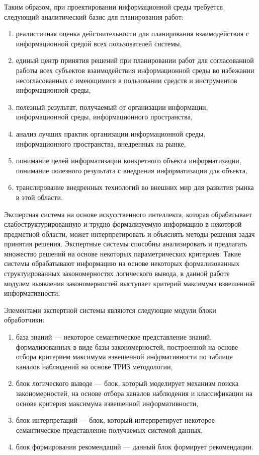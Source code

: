 Таким образом, при проектировании информационной среды требуется следующий аналитический базис для планирования работ: 
\begin{enumerate}
	\item реалистичная оценка действительности для планирования взаимодействия с информационной средой всех пользователей системы,
	\item единый центр принятия решений при планировании работ для согласованной работы всех субъектов взаимодействия информационной среды во избежании несогласованных с имеющимися в пользовании средств и инструментов информационной среды,
	\item полезный результат, получаемый от организации информации, информационной среды, информационного пространства,
	\item анализ лучших практик организации информационной среды, информационного пространства, внедренных на рынке,
	\item понимание целей информатизации конкретного объекта информатизации, понимание полезного результата с внедрения информатизации для объекта,
	\item транслирование внедренных технологий во внешних мир для развития рынка в этой области.
\end{enumerate}

Экспертная система на основе искусственного интеллекта, которая обрабатывает слабоструктурированную и трудно формализуемую информацию в некоторой предметной области, может интерпретировать и объяснять методы решения задач принятия решения. Экспертные системы способны анализировать и предлагать множество решений на основе некоторых параметрических критериев. Такие системы обрабатывают информацию на основе некоторых формализованных структуированных закономерностях логического вывода, в данной работе модулем выявления закономерностей выступает критерий максимума взвешенной информативности.

Элементами экспертной системы являются следующие модули блоки обработчики:
\begin{enumerate}
    \item база знаний — некоторое семантическое представление знаний, формализованных в виде базы закономерностей, построенной на основе отбора критерием максимума взвешенной инфрмативности по таблице каналов наблюдений на основе ТРИЗ методологии,
    \item блок логического выводе — блок, который моделирует механизм поиска закономерностей, на основе отбора каналов наблюдения и классификации на основе критерия максимума взвешенной информативности,
    \item блок интерпретаций — блок, который интерпретирует некоторое семантическое представление получаемых системой данных,
    \item блок формирования рекомендаций — данный блок формирует рекомендации.
\end{enumerate}

